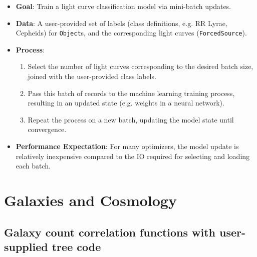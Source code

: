 \documentclass[DM,authoryear,toc]{lsstdoc}
\begin{document}
\begin{itemize}
  \item \textbf{Goal}: Train a light curve classification model via mini-batch updates.
  \item \textbf{Data}: A user-provided set of labels (class definitions, e.g. RR
  Lyrae, Cepheids) for \texttt{Object}s, and the corresponding light curves
  (\texttt{ForcedSource}).
  \item \textbf{Process}:
  \begin{enumerate}
    \item Select the number of light curves corresponding to the desired batch
    size, joined with the user-provided class labels.
    \item Pass this batch of records to the machine learning training process,
    resulting in an updated state (e.g. weights in a neural network).
    \item Repeat the process on a new batch, updating the model state until convergence.
  \end{enumerate}
  \item \textbf{Performance Expectation}: For many optimizers, the model update
  is relatively inexpensive compared to the IO required for selecting and
  loading each batch.
\end{itemize}




\section{Galaxies and Cosmology}

\subsection{Galaxy count correlation functions with user-supplied tree code}
\end{document}
